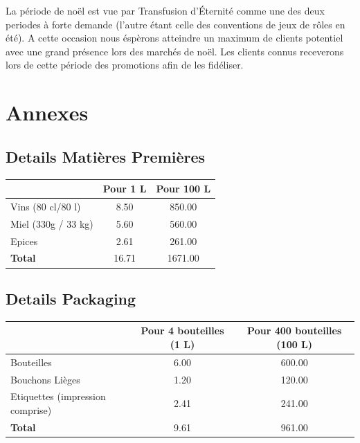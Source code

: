 \documentclass[10pt,a4paper]{article}
\newcommand{\tde}{Transfusion d'Éternité}
\begin{document}
La période de noël est vue par \tde{} comme une des deux periodes à forte demande (l'autre étant celle des conventions de jeux de rôles en été).
A cette occasion nous éspèrons atteindre un maximum de clients potentiel avec une grand présence lors des marchés de noël.
Les clients connus receverons lors de cette période des promotions afin de les fidéliser.
\section{Annexes}
\subsection{Details Matières Premières}
\begin{tabular}{|l|S[table-format=4.2]|S[table-format=4.2]|}
\hline
& \textbf{Pour 1 L} & \textbf{Pour 100 L} \\\hline
Vins (80 cl/80 l) & 8.50 & 850.00 \\
Miel (330g / 33 kg) & 5.60 & 560.00 \\
Epices & 2.61 & 261.00 \\\hline
\textbf{Total} & 16.71 & 1671.00\\\hline
\end{tabular}
\subsection{Details Packaging}
\begin{tabular}{|l|S[table-format=4.2]|S[table-format=4.2]|}
\hline
& \textbf{Pour 4 bouteilles (1 L)} & \textbf{Pour 400 bouteilles (100 L)} \\\hline
Bouteilles & 6.00 & 600.00 \\
Bouchons Lièges & 1.20 & 120.00 \\
Etiquettes (impression comprise)& 2.41& 241.00 \\\hline
\textbf{Total} & 9.61 & 961.00\\\hline
\end{tabular}
\end{document}
